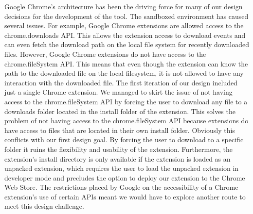 \documentclass[letterpaper,twocolumn,10pt]{article}
\begin{document}
Google Chrome’s architecture has been the driving force for many of our design decisions for the development of the tool. The sandboxed environment has caused several issues. For example, Google Chrome extensions are allowed access to the chrome.downloads API. This allows the extension access to download events and can even fetch the download path on the local file system for recently downloaded files. However, Google Chrome extensions do not have access to the chrome.fileSystem API. This means that even though the extension can know the path to the downloaded file on the local filesystem, it is not allowed to have any interaction with the downloaded file. The first iteration of our design included just a single Chrome extension. We managed to skirt the issue of not having access to the chrome.fileSystem API by forcing the user to download any file to a downloads folder located in the install folder of the extension. This solves the problem of not having access to the chrome.fileSystem API because extensions do have access to files that are located in their own install folder. Obviously this conflicts with our first design goal. By forcing the user to download to a specific folder it ruins the flexibility and usability of the extension. Furthermore, the extension’s install directory is only available if the extension is loaded as an unpacked extension, which requires the user to load the unpacked extension in developer mode and precludes the option to deploy our extension to the Chrome Web Store. The restrictions placed by Google on the accessibility of a Chrome extension’s use of certain APIs meant we would have to explore another route to meet this design challenge.
\end{document}
